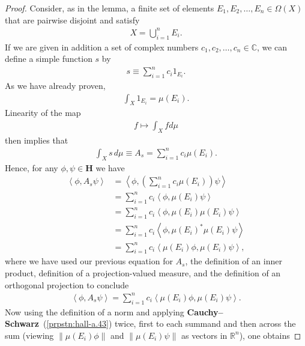 \begin{proof}
    \leanok
Consider, as in the lemma, a finite set of elements $E_1, E_2, \ldots, E_n \in \Omega(X)$ that are pairwise disjoint and satisfy
\begin{align}
    X = \bigcup\limits_{i = 1}^n E_i.
\end{align}
If we are given in addition a set of complex numbers $c_1, c_2, \ldots, c_n \in \mathbb{C}$, we can define a simple function $s$ by
\begin{align}
    s \equiv \sum_{i = 1}^n c_i 1_{E_i}.
\end{align}
As we have already proven,
\begin{align}
    \int_X 1_{E_i} = \mu(E_i).
\end{align}
Linearity of the map
\begin{align}
    f \longmapsto \int_X f d\mu
\end{align}
then implies that
\begin{align}
    \int_X s \, d\mu \equiv A_s = \sum_{i = 1}^n c_i \mu(E_i).
\end{align}
Hence, for any $\phi, \psi \in \mathbf{H}$ we have
\begin{align}
    \left< \phi, A_s \psi \right> &= \left< \phi, \left(  \sum_{i = 1}^n c_i \mu(E_i) \right) \psi \right> \\
                                  &= \sum_{i = 1}^n c_i \left< \phi, \mu(E_i) \psi \right> \\
                                  &= \sum_{i = 1}^n c_i \left< \phi, \mu(E_i) \mu(E_i) \psi \right> \\
                                  &= \sum_{i = 1}^n c_i \left< \phi, \mu(E_i)^* \mu(E_i) \psi \right> \\
                                  &= \sum_{i = 1}^n c_i \left< \mu(E_i) \phi, \mu(E_i) \psi \right>,
\end{align}
where we have used our previous equation for $A_s$, the definition of an inner product, definition of a projection-valued measure, and the definition of an orthogonal projection to conclude
\begin{align}
    \left< \phi, A_s \psi \right> = \sum_{i = 1}^n c_i \left< \mu(E_i) \phi, \mu(E_i) \psi \right>.
\end{align}
Now using the definition of a norm and applying \textbf{Cauchy–Schwarz}~(\ref{prpstn:hall-a.43}) twice, first to each summand and then across the sum (viewing $\|\mu(E_i) \phi\|$ and $\|\mu(E_i) \psi\|$ as vectors in $\mathbb{R}^n$), one obtains

\end{proof}

